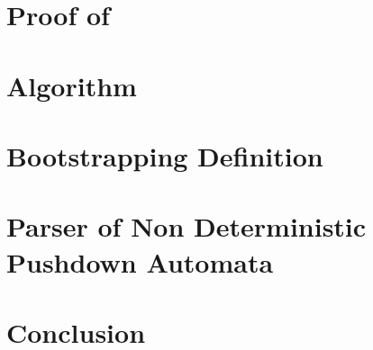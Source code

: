 \documentclass[a4paper,USenglish]{lipics}
\begin{document}
\section{Proof of }
\label{Section:proof}


\section{Algorithm}
\label{Section:algorithm}
%

\section{Bootstrapping Definition}
\label{Section:bootstrapping}
%

\section{Parser of Non Deterministic Pushdown Automata}
\label{Section:bridge}

\section{Conclusion}
\label{Section:zz}
%

\small
%

\end{document}

